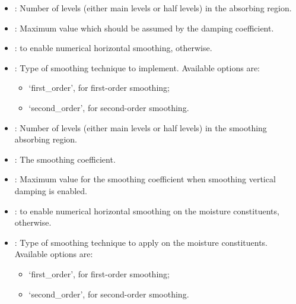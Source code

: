 \documentclass[letterpaper,10pt,english]{sphinxmanual}
\begin{document}
\begin{description}
\begin{itemize}
\begin{itemize}
\end{itemize}

\item {} 
: Number of levels (either main levels or half levels) in the absorbing region.

\item {} 
: Maximum value which should be assumed by the damping coefficient.

\item {} 
:  to enable numerical horizontal smoothing,  otherwise.

\item {} 
: Type of smoothing technique to implement. Available options are:
\begin{itemize}
\item {} 
‘first\_order’, for first-order smoothing;

\item {} 
‘second\_order’, for second-order smoothing.

\end{itemize}

\item {} 
: Number of levels (either main levels or half levels)           in the smoothing absorbing region.

\item {} 
: The smoothing coefficient.

\item {} 
: Maximum value for the smoothing coefficient when           smoothing vertical damping is enabled.

\item {} 
:  to enable numerical horizontal smoothing               on the moisture constituents,  otherwise.

\item {} 
: Type of smoothing technique to apply on the moisture              constituents. Available options are:
\begin{itemize}
\item {} 
‘first\_order’, for first-order smoothing;

\item {} 
‘second\_order’, for second-order smoothing.


\end{itemize}
\end{itemize}
\end{description}
\end{document}
